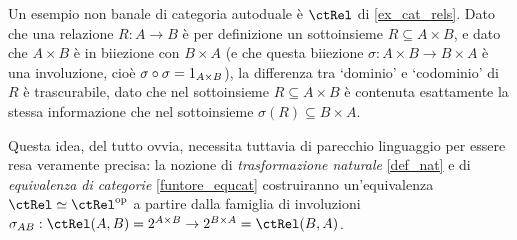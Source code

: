 \begin{example}\label{rel_autoduale}
	Un esempio non banale di categoria autoduale è \(\ctRel\) di \ref{ex_cat_rels}. Dato che una relazione \(R : A\to B\) è per definizione un sottoinsieme \(R\subseteq A\times B\), e dato che \(A\times B\) è in biiezione con \(B\times A\) (e che questa biiezione \(\sigma : A\times B \to B\times A\) è una involuzione, cioè \(\sigma\circ\sigma = 1_{A\times B}\)), la differenza tra `dominio' e `codominio' di \(R\) è trascurabile, dato che nel sottoinsieme \(R \subseteq A\times B\) è contenuta esattamente la stessa informazione che nel sottoinsieme \(\sigma(R)\subseteq B\times A\).

	Questa idea, del tutto ovvia, necessita tuttavia di parecchio linguaggio per essere resa veramente precisa: la nozione di \emph{trasformazione naturale} \ref{def_nat} e di \emph{equivalenza di categorie} \ref{funtore_equcat} costruiranno un'equivalenza \(\ctRel\simeq \ctRel^\op\) a partire dalla famiglia di involuzioni \(\sigma_{AB} : \Hom{\ctRel}(A,B) = \pow {A\times B} \to \pow {B\times A} = \Hom{\ctRel}(B,A)\).
\end{example}
